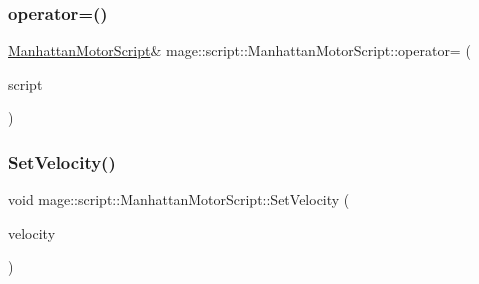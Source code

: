\hypertarget{classmage_1_1script_1_1_manhattan_motor_script_a2b185979a64b35d9f9d6f4027724560a}{}\label{classmage_1_1script_1_1_manhattan_motor_script_a2b185979a64b35d9f9d6f4027724560a} 
\subsubsection{\texorpdfstring{operator=()}{operator=()}\hspace{0.1cm}{\footnotesize\ttfamily [2/2]}}
{\footnotesize\ttfamily \hyperlink{classmage_1_1script_1_1_manhattan_motor_script}{Manhattan\+Motor\+Script}\& mage\+::script\+::\+Manhattan\+Motor\+Script\+::operator= (\begin{DoxyParamCaption}\item[{\hyperlink{classmage_1_1script_1_1_manhattan_motor_script}{Manhattan\+Motor\+Script} \&\&}]{script }\end{DoxyParamCaption})\hspace{0.3cm}{\ttfamily [delete]}}

\hypertarget{classmage_1_1script_1_1_manhattan_motor_script_acf4db52ae6b0c9f97c0b7e719acea6bc}{}\label{classmage_1_1script_1_1_manhattan_motor_script_acf4db52ae6b0c9f97c0b7e719acea6bc} 
\subsubsection{\texorpdfstring{Set\+Velocity()}{SetVelocity()}}
{\footnotesize\ttfamily void mage\+::script\+::\+Manhattan\+Motor\+Script\+::\+Set\+Velocity (\begin{DoxyParamCaption}\item[{\hyperlink{namespacemage_aa97e833b45f06d60a0a9c4fc22ae02c0}{F32}}]{velocity }\end{DoxyParamCaption})\hspace{0.3cm}{\ttfamily [noexcept]}}

\hypertarget{classmage_1_1script_1_1_manhattan_motor_script_ae7fbaba1da04d00257e5d491868efc53}{}\label{classmage_1_1script_1_1_manhattan_motor_script_ae7fbaba1da04d00257e5d491868efc53} 
